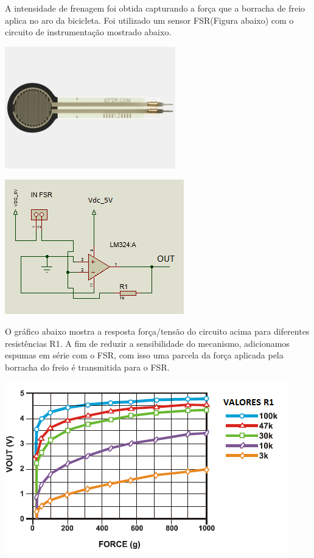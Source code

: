 A intensidade de frenagem foi obtida capturando a força que a borracha de freio aplica no aro da bicicleta. Foi utilizado um sensor FSR(Figura abaixo) com o circuito de instrumentação mostrado abaixo.

            \begin{center}
   	\includegraphics[scale=0.80]{figuras/FSR_2.png}
        \label{fsr}
   \end{center}

            \begin{center}
   	\includegraphics[scale=0.80]{figuras/FSR.png}
        \label{con_fsr}
   \end{center}

O gráfico abaixo mostra a resposta força/tensão do circuito acima para diferentes resistências R1.  A fim de reduzir a sensibilidade do mecanismo, adicionamos espumas em série com o FSR, com isso uma parcela da força aplicada pela borracha do freio é transmitida para o FSR.


            \begin{center}
   	\includegraphics[scale=0.80]{figuras/grafico_fsr.png}
        \label{graf_fsr}
   \end{center}
   

